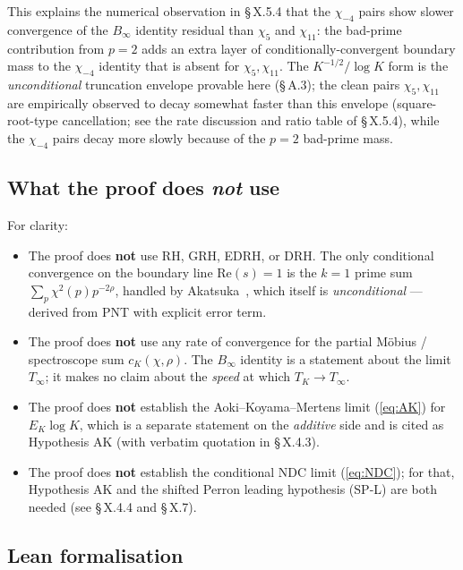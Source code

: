 This explains the numerical observation in \S\,X.5.4 that the \(\chi_{-4}\)
pairs show slower convergence of the \(B_\infty\) identity residual
than \(\chi_5\) and \(\chi_{11}\): the bad-prime contribution from
\(p = 2\) adds an extra layer of conditionally-convergent boundary
mass to the \(\chi_{-4}\) identity that is absent for \(\chi_5,
\chi_{11}\). The \(K^{-1/2}/\log K\) form is the \emph{unconditional}
truncation envelope provable here (\S\,A.3); the clean pairs
\(\chi_5, \chi_{11}\) are empirically observed to decay somewhat
faster than this envelope (square-root-type cancellation; see the
rate discussion and ratio table of \S\,X.5.4), while the \(\chi_{-4}\)
pairs decay more slowly because of the \(p = 2\) bad-prime mass.

\subsection{What the proof does \emph{not} use}

For clarity:

\begin{itemize}
\item
  The proof does \textbf{not} use RH, GRH, EDRH, or DRH. The only
  conditional convergence on the boundary line \(\mathrm{Re}(s) = 1\) is
  the \(k = 1\) prime sum \(\sum_p \chi^2(p) p^{-2\rho}\), handled by
  Akatsuka~\cite[Lemma~2.1 \& eq.~(2.5)]{AkatsukaH2013EulerProduct}, which itself is
  \emph{unconditional} --- derived from PNT with explicit error term.
\item
  The proof does \textbf{not} use any rate of convergence for the partial
  Möbius / spectroscope sum \(c_K(\chi, \rho)\). The \(B_\infty\) identity
  is a statement about the limit \(T_\infty\); it makes no claim about
  the \emph{speed} at which \(T_K \to T_\infty\).
\item
  The proof does \textbf{not} establish the Aoki--Koyama--Mertens limit
  (\ref{eq:AK}) for \(E_K \log K\), which is a separate statement on the
  \emph{additive} side and is cited as Hypothesis AK (with verbatim
  quotation in \S\,X.4.3).
\item
  The proof does \textbf{not} establish the conditional NDC limit
  (\ref{eq:NDC}); for that, Hypothesis AK and the shifted Perron
  leading hypothesis (SP-L) are both needed (see \S\,X.4.4 and \S\,X.7).
\end{itemize}

\subsection{Lean formalisation}

